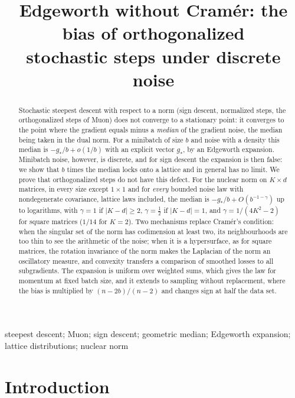 \documentclass[anon,12pt]{colt2026}
\title[Edgeworth without Cram\'er for norm-steepest steps]{Edgeworth without Cram\'er: the bias of orthogonalized\\ stochastic steps under discrete noise}
\begin{document}
\maketitle

\begin{abstract}%
Stochastic steepest descent with respect to a norm (sign descent, normalized steps, the orthogonalized steps of Muon)
does not converge to a stationary point: it converges to the point where the gradient equals minus a \emph{median} of
the gradient noise, the median being taken in the dual norm. For a minibatch of size $b$ and noise with a density this
median is $-g_\ast/b+o(1/b)$ with an explicit vector $g_\ast$, by an Edgeworth expansion. Minibatch noise, however, is
discrete, and for sign descent the expansion is then false: we show that $b$ times the median locks onto a lattice and
in general has no limit. We prove that orthogonalized steps do not have this defect. For the nuclear norm on $K\times d$
matrices, in every size except $1\times1$ and for \emph{every} bounded noise law with nondegenerate covariance, lattice
laws included, the median is $-g_\ast/b+O(b^{-1-\gamma})$ up to logarithms, with $\gamma=1$ if $|K-d|\ge2$,
$\gamma=\frac12$ if $|K-d|=1$, and $\gamma=1/(4K^2-2)$ for square matrices ($1/14$ for $K=2$). Two mechanisms replace
Cram\'er's condition: when the singular set of the norm has codimension at least two, its neighbourhoods are too thin
to see the arithmetic of the noise; when it is a hypersurface, as for square matrices, the rotation invariance of the
norm makes the Laplacian of the norm an oscillatory measure, and convexity transfers a comparison of smoothed losses to
all subgradients. The expansion is uniform over weighted sums, which gives the law for momentum at fixed batch size, and
it extends to sampling without replacement, where the bias is multiplied by $(n-2b)/(n-2)$ and changes sign at
half the data set.
\end{abstract}
\begin{keywords}%
steepest descent; Muon; sign descent; geometric median; Edgeworth expansion; lattice distributions; nuclear norm
\end{keywords}

\section{Introduction}
\end{document}
